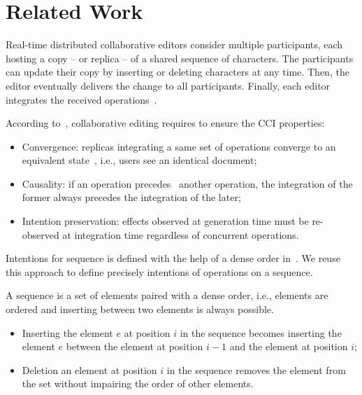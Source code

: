 \section{Related Work}
\label{sec:relatedwork}

Real-time distributed collaborative editors consider multiple participants, each
hosting a copy -- or replica -- of a shared sequence of characters. The
participants can update their copy by inserting or deleting characters at any
time. Then, the editor eventually delivers the change to all
participants. Finally, each editor integrates the received
operations~\cite{saito2005optimistic}.

\noindent According to~\cite{sun1998achieving}, collaborative editing requires
to ensure the CCI properties:
\begin{itemize}
\item Convergence: replicas integrating a same set of operations converge to an
  equivalent state~\cite{bailis2013eventual, shapiro2011conflict}, i.e., users
  see an identical document;
\item Causality: if an operation precedes~\cite{lamport1978time} another
  operation, the integration of the former always precedes the integration of
  the later;
\item Intention preservation: effects observed at generation time must be
  re-observed at integration time regardless of concurrent operations. 
\end{itemize}

Intentions for sequence is defined with the help of a dense order
in~\cite{weiss2010logootundo}. We reuse this approach to define
precisely intentions of operations on a sequence.



\begin{definition}
  A sequence is a set of elements paired with a dense order, i.e., elements are
  ordered and inserting between two elements is always possible.
  \begin{itemize}[noitemsep]
  \item Inserting the element $e$ at position $i$ in the sequence becomes
    inserting the element $e$ between the element at position $i-1$ and the
    element at position $i$;
  \item Deletion an element at position $i$ in the sequence removes the element
    from the set without impairing the order of other elements.
  \end{itemize}
\end{definition}



